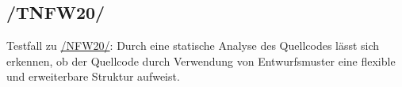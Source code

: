 \subsection*{/TNFW20/}

\label{/TNFW20/} Testfall zu \hyperref[/NFW20/]{/NFW20/}: Durch eine \gls{statische Analyse} des \Gls{Quellcode}s lässt sich erkennen, ob der \Gls{Quellcode} durch Verwendung von \Gls{Entwurfsmuster} eine flexible und erweiterbare Struktur aufweist.
